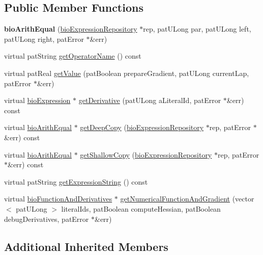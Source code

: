 \subsection*{Public Member Functions}
\begin{DoxyCompactItemize}
\item 
\mbox{\label{classbio_arith_equal_a081112a3f17041cf4f7c5da396cddc10}} 
{\bfseries bio\+Arith\+Equal} (\hyperlink{classbio_expression_repository}{bio\+Expression\+Repository} $\ast$rep, pat\+U\+Long par, pat\+U\+Long left, pat\+U\+Long right, pat\+Error $\ast$\&err)
\item 
virtual pat\+String \hyperlink{classbio_arith_equal_ab4a9657d32f37ab61fbe2597b3c4b9eb}{get\+Operator\+Name} () const
\item 
virtual pat\+Real \hyperlink{classbio_arith_equal_a7db4558e7e275cdf8cb525a23d7dac28}{get\+Value} (pat\+Boolean prepare\+Gradient, pat\+U\+Long current\+Lap, pat\+Error $\ast$\&err)
\item 
virtual \hyperlink{classbio_expression}{bio\+Expression} $\ast$ \hyperlink{classbio_arith_equal_a91d4c7481582a8a039dc373eddc707b8}{get\+Derivative} (pat\+U\+Long a\+Literal\+Id, pat\+Error $\ast$\&err) const
\item 
virtual \hyperlink{classbio_arith_equal}{bio\+Arith\+Equal} $\ast$ \hyperlink{classbio_arith_equal_a01b4bf9f63da99bf1ef17c518d2f6eab}{get\+Deep\+Copy} (\hyperlink{classbio_expression_repository}{bio\+Expression\+Repository} $\ast$rep, pat\+Error $\ast$\&err) const
\item 
virtual \hyperlink{classbio_arith_equal}{bio\+Arith\+Equal} $\ast$ \hyperlink{classbio_arith_equal_ace5ebcd053feb9fa4a7e97920fdfe030}{get\+Shallow\+Copy} (\hyperlink{classbio_expression_repository}{bio\+Expression\+Repository} $\ast$rep, pat\+Error $\ast$\&err) const
\item 
virtual pat\+String \hyperlink{classbio_arith_equal_a69839ab065a8bd3d9d0409fbd529c22e}{get\+Expression\+String} () const
\item 
virtual \hyperlink{classbio_function_and_derivatives}{bio\+Function\+And\+Derivatives} $\ast$ \hyperlink{classbio_arith_equal_a9462014bd44ab537c4e6d631a46e97b7}{get\+Numerical\+Function\+And\+Gradient} (vector$<$ pat\+U\+Long $>$ literal\+Ids, pat\+Boolean compute\+Hessian, pat\+Boolean debug\+Derivatives, pat\+Error $\ast$\&err)
\end{DoxyCompactItemize}
\subsection*{Additional Inherited Members}



